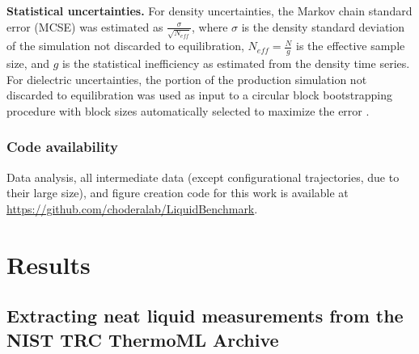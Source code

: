 \documentclass[aip, jcp, reprint]{revtex4-1}  %
\begin{document}
{\bf Statistical uncertainties.}
For density uncertainties, the Markov chain standard error (MCSE) was estimated as $\frac{\sigma}{\sqrt{N_{eff}}}$, where $\sigma$ is the density standard deviation of the simulation not discarded to equilibration, $N_{eff} = \frac{N}{g}$ is the effective sample size, and $g$ is the statistical inefficiency as estimated from the density time series.
For dielectric uncertainties, the portion of the production simulation not discarded to equilibration was used as input to a circular block bootstrapping procedure \cite{sheppard_2015_15681} with block sizes automatically selected to maximize the error \cite{flyvbjerg1989error}.

\subsubsection{Code availability}

Data analysis, all intermediate data (except configurational trajectories, due to their large size), and figure creation code for this work is available at \url{https://github.com/choderalab/LiquidBenchmark}.  


\section{Results}

\subsection{Extracting neat liquid measurements from the NIST TRC ThermoML Archive}
\label{section:filtering-thermoml}
\end{document}
